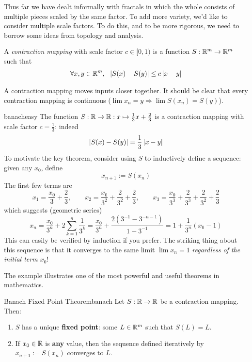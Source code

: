 Thus far we have dealt informally with fractals in which the whole consists of multiple pieces scaled by the same factor. To add more variety, we'd like to consider multiple scale factors. To do this, and to be more rigorous, we need to borrow some ideas from topology and analysis.

\begin{defn}{}{}
	A \emph{contraction mapping} with scale factor $c\in[0,1)$ is a function $S:\mathbb{R}^m\to\mathbb{R}^m$ such that
	\[
		\forall x,y\in\mathbb{R}^m,\ \ \left| S(x)-S(y)\right|\le c\left| x-y\right|
	\]
\end{defn}

A contraction mapping moves inputs closer together. It should be clear that every contraction mapping is continuous ($\lim x_n=y\Longrightarrow \lim S(x_n)=S(y)$).

\begin{example}{}{banacheasy}
	The function $S:\mathbb{R}\to\mathbb{R}:x\mapsto \frac 13x+\frac 23$ is a contraction mapping with scale factor $c=\frac 13$: indeed
	\[
		\left| S(x)-S(y)\right|=\frac 13\left| x-y\right|
	\]
	To motivate the key theorem, consider using $S$ to inductively define a sequence: given any $x_0$, define
	\[
		x_{n+1}:=S(x_n)
	\]
	The first few terms are
	\[
		x_1=\frac{x_0}3+\frac 23,\qquad x_2=\frac{x_0}{3^2}+\frac 2{3^2}+\frac 23,\qquad x_3=\frac{x_0}{3^3}+\frac 2{3^3}+\frac 2{3^2}+\frac 23
	\]
	which suggests (geometric series)
	\[
		x_n=\frac{x_0}{3^n}+2\sum_{k=1}^{n}\frac 1{3^k} 
		=\frac{x_0}{3^n}+\frac{2(3^{-1}-3^{-n-1})}{1-3^{-1}}
		=1+\frac 1{3^n}(x_0-1)
	\]
	This can easily be verified by induction if you prefer. The striking thing about this sequence is that it converges to the same limit $\lim x_n=1$ \emph{regardless of the initial term $x_0$}!
\end{example}

The example illustrates one of the most powerful and useful theorems in mathematics.

\begin{thm}{Banach Fixed Point Theorem}{banach}
	Let $S:\mathbb{R}\to\mathbb{R}$ be a contraction mapping. Then:
	\begin{enumerate}
	  \item $S$ has a unique \textbf{fixed point}: some $L\in\mathbb{R}^m$ such that $S(L)=L$.
	  \item If $x_0\in\mathbb{R}$ is \textbf{any} value, then the sequence defined iteratively by $x_{n+1}:=S(x_n)$ converges to $L$.
	\end{enumerate}
\end{thm}


